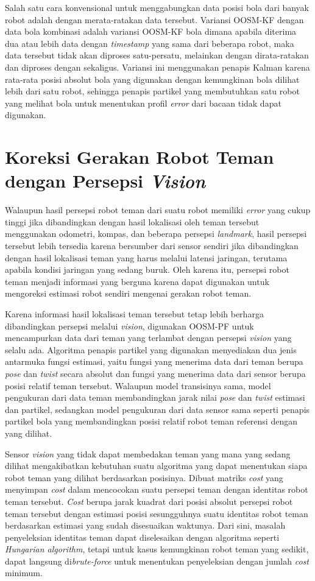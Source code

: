 Salah satu cara konvensional untuk menggabungkan data posisi bola dari banyak robot adalah dengan merata-ratakan data tersebut. Variansi OOSM-KF dengan data bola kombinasi adalah variansi OOSM-KF bola dimana apabila diterima dua atau lebih data dengan \textit{timestamp} yang sama dari beberapa robot, maka data tersebut tidak akan diproses satu-persatu, melainkan dengan dirata-ratakan dan diproses dengan sekaligus. Variansi ini menggunakan penapis Kalman karena rata-rata posisi absolut bola yang digunakan dengan kemungkinan bola dilihat lebih dari satu robot, sehingga penapis partikel yang membutuhkan satu robot yang melihat bola untuk menentukan profil \textit{error} dari bacaan tidak dapat digunakan.

\section{Koreksi Gerakan Robot Teman dengan Persepsi \textit{Vision}}

Walaupun hasil persepsi robot teman dari suatu robot memiliki \textit{error} yang cukup tinggi jika dibandingkan dengan hasil lokalisasi oleh teman tersebut menggunakan odometri, kompas, dan beberapa persepsi \textit{landmark}, hasil persepsi tersebut lebih tersedia karena bersumber dari sensor sendiri jika dibandingkan dengan hasil lokalisasi teman yang harus melalui latensi jaringan, terutama apabila kondisi jaringan yang sedang buruk. Oleh karena itu, persepsi robot teman menjadi informasi yang berguna karena dapat digunakan untuk mengoreksi estimasi robot sendiri mengenai gerakan robot teman.

Karena informasi hasil lokalisasi teman tersebut tetap lebih berharga dibandingkan persepsi melalui \textit{vision}, digunakan OOSM-PF untuk mencampurkan data dari teman yang terlambat dengan persepsi \textit{vision} yang selalu ada. Algoritma penapis partikel yang digunakan menyediakan dua jenis antarmuka fungsi estimasi, yaitu fungsi yang menerima data dari teman berupa \textit{pose} dan \textit{twist} secara absolut dan fungsi yang menerima data dari sensor berupa posisi relatif teman tersebut. Walaupun model transisinya sama, model pengukuran dari data teman membandingkan jarak nilai \textit{pose} dan \textit{twist} estimasi dan partikel, sedangkan model pengukuran dari data sensor sama seperti penapis partikel bola yang membandingkan posisi relatif robot teman referensi dengan yang dilihat.

Sensor \textit{vision} yang tidak dapat membedakan teman yang mana yang sedang dilihat mengakibatkan kebutuhan suatu algoritma yang dapat menentukan siapa robot teman yang dilihat berdasarkan posisinya. Dibuat matriks \textit{cost} yang menyimpan \textit{cost} dalam mencocokan suatu persepsi teman dengan identitas robot teman tersebut. \textit{Cost} berupa jarak kuadrat dari posisi absolut persepsi robot teman tersebut dengan estimasi posisi sesungguhnya suatu identitas robot teman berdasarkan estimasi yang sudah disesuaikan waktunya. Dari sini, masalah penyeleksian identitas teman dapat diselesaikan dengan algoritma seperti \textit{Hungarian algorithm}, tetapi untuk kasus kemungkinan robot teman yang sedikit, dapat langsung di\textit{brute-force} untuk menentukan penyeleksian dengan jumlah \textit{cost} minimum.
